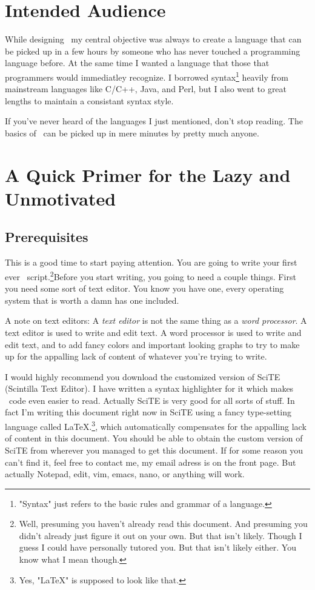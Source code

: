 \documentclass{book}
\begin{document}
\section{Intended Audience}
While designing \SSquared\ my central objective was always to create a language that can be picked up in a few hours by someone who has never touched a programming language before.  At the same time I wanted a language that those that programmers would immediatley recognize.  I borrowed syntax\footnote{"Syntax" just refers to the basic rules and grammar of a language.} heavily from mainstream languages like C/C++, Java, and Perl, but I also went to great lengths to maintain a consistant syntax style.

If you've never heard of the languages I just mentioned, don't stop reading.  The basics of \SSquared\ can be picked up in mere minutes by pretty much anyone.  

\section{A Quick Primer for the Lazy and Unmotivated}

\subsection{Prerequisites}

This is a good time to start paying attention.  You are going to write your first ever \SSquared\ script.\footnote{Well, presuming you haven't already read this document.  And presuming you didn't already just figure it out on your own.  But that isn't likely.  Though I guess I could have personally tutored you.  But that isn't likely either.  You know what I mean though.}Before you start writing, you going to need a couple things.  First you need some sort of text editor.  You know you have one, every operating system that is worth a damn has one included.  

A note on text editors: A \emph{text editor} is not the same thing as a \emph{word processor}.  A text editor is used to write and edit text.  A word processor is used to write and edit text, and to add fancy colors and important looking graphs to try to make up for the appalling lack of content of whatever you're trying to write.


I would highly recommend you download the customized version of SciTE (Scintilla Text Editor). I have written a syntax highlighter for it which makes \SSquared\ code even easier to read.  Actually SciTE is very good for all sorts of stuff.  In fact I'm writing this document right now in SciTE using a fancy type-setting language called \LaTeX.\footnote{Yes, "\LaTeX" is supposed to look like that.}, which automatically compensates for the appalling lack of content in this document.  You should be able to obtain the custom version of SciTE from wherever you managed to get this document.  If for some reason you can't find it, feel free to contact me, my email adress is on the front page.  But actually Notepad, edit, vim, emacs, nano, or anything will work.
\end{document}

